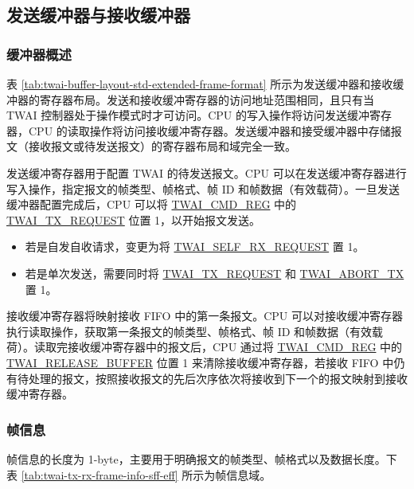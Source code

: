\documentclass[main\_\_CN.tex]{subfiles}
\begin{document}
\subsection{发送缓冲器与接收缓冲器}
\subsubsection{缓冲器概述}



表 \ref{tab:twai-buffer-layout-std-extended-frame-format} 所示为发送缓冲器和接收缓冲器的寄存器布局。发送和接收缓冲寄存器的访问地址范围相同，且只有当 TWAI 控制器处于操作模式时才可访问。CPU 的写入操作将访问发送缓冲寄存器，CPU 的读取操作将访问接收缓冲寄存器。发送缓冲器和接受缓冲器中存储报文（接收报文或待发送报文）的寄存器布局和域完全一致。

发送缓冲寄存器用于配置 TWAI 的待发送报文。CPU 可以在发送缓冲寄存器进行写入操作，指定报文的帧类型、帧格式、帧 ID 和帧数据（有效载荷）。一旦发送缓冲器配置完成后，CPU 可以将 \hyperref[regdesc:TWAICMDREG]{TWAI\_CMD\_REG} 中的 \hyperref[fielddesc:TWAITXREQUEST]{TWAI\_TX\_REQUEST} 位置 1，以开始报文发送。

\begin{itemize}
    \item 若是自发自收请求，变更为将 \hyperref[fielddesc:TWAISELFRXREQUEST]{TWAI\_SELF\_RX\_REQUEST} 置 1。
    \item 若是单次发送，需要同时将 \hyperref[fielddesc:TWAITXREQUEST]{TWAI\_TX\_REQUEST} 和 \hyperref[fielddesc:TWAIABORTTX]{TWAI\_ABORT\_TX} 置 1。
\end{itemize}



接收缓冲寄存器将映射接收 FIFO 中的第一条报文。CPU 可以对接收缓冲寄存器执行读取操作，获取第一条报文的帧类型、帧格式、帧 ID 和帧数据（有效载荷）。读取完接收缓冲寄存器中的报文后，CPU 通过将 \hyperref[regdesc:TWAICMDREG]{TWAI\_CMD\_REG} 中的 \hyperref[fielddesc:TWAIRELEASEBUFFER]{TWAI\_RELEASE\_BUFFER} 位置 1 来清除接收缓冲寄存器，若接收 FIFO 中仍有待处理的报文，按照接收报文的先后次序依次将接收到下一个的报文映射到接收缓冲寄存器。


\subsubsection{帧信息}
帧信息的长度为 1-byte，主要用于明确报文的帧类型、帧格式以及数据长度。下表 \ref{tab:twai-tx-rx-frame-info-sff-eff} 所示为帧信息域。
\end{document}
